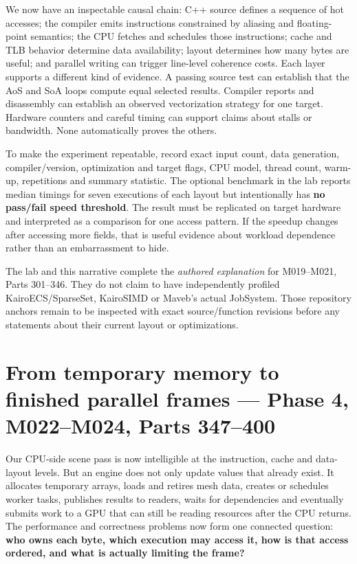 We now have an inspectable causal chain: C++ source defines a sequence of hot accesses; the compiler emits instructions constrained by aliasing and floating-point semantics; the CPU fetches and schedules those instructions; cache and TLB behavior determine data availability; layout determines how many bytes are useful; and parallel writing can trigger line-level coherence costs. Each layer supports a different kind of evidence. A passing source test can establish that the AoS and SoA loops compute equal selected results. Compiler reports and disassembly can establish an observed vectorization strategy for one target. Hardware counters and careful timing can support claims about stalls or bandwidth. None automatically proves the others.

To make the experiment repeatable, record exact input count, data generation, compiler/version, optimization and target flags, CPU model, thread count, warm-up, repetitions and summary statistic. The optional benchmark in the lab reports median timings for seven executions of each layout but intentionally has \textbf{no pass/fail speed threshold}. The result must be replicated on target hardware and interpreted as a comparison for one access pattern. If the speedup changes after accessing more fields, that is useful evidence about workload dependence rather than an embarrassment to hide.

The lab and this narrative complete the \emph{authored explanation} for M019--M021, Parts 301--346. They do not claim to have independently profiled KairoECS/SparseSet, KairoSIMD or Maveb's actual JobSystem. Those repository anchors remain to be inspected with exact source/function revisions before any statements about their current layout or optimizations.

\section{From temporary memory to finished parallel frames --- Phase 4, M022--M024, Parts 347--400}\label{01-foundations-i-ch007-from-temporary-memory-to-finished-parallel-frames-phase-4-m022m024-parts-347400}

Our CPU-side scene pass is now intelligible at the instruction, cache and data-layout levels. But an engine does not only update values that already exist. It allocates temporary arrays, loads and retires mesh data, creates or schedules worker tasks, publishes results to readers, waits for dependencies and eventually submits work to a GPU that can still be reading resources after the CPU returns. The performance and correctness problems now form one connected question: \textbf{who owns each byte, which execution may access it, how is that access ordered, and what is actually limiting the frame?}

